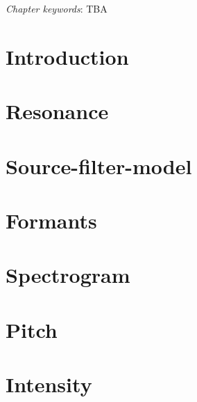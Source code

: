 \documentclass[
]{book}
\begin{document}
\emph{Chapter keywords}: TBA

\section{Introduction}\label{introduction}

\section{Resonance}\label{resonance}

\section{Source-filter-model}\label{source-filter-model}

\section{Formants}\label{formants}

\section{Spectrogram}\label{spectrogram}

\section{Pitch}\label{pitch}

\section{Intensity}\label{intensity-1}

  
\end{document}

